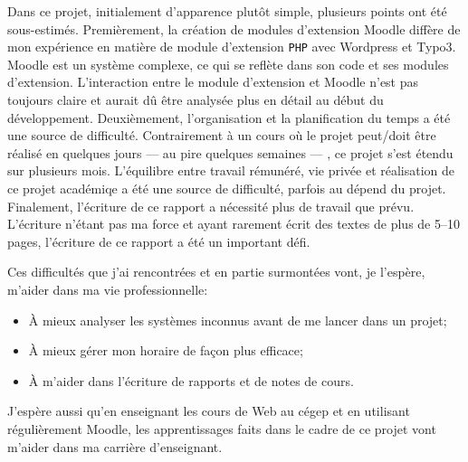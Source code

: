\begin{conclusion}
Dans ce projet, initialement d'apparence plut\^ot simple, plusieurs points ont \'et\'e sous-estim\'es.
Premi\`erement, la cr\'eation de modules d'extension Moodle diff\`ere de mon exp\'erience en mati\`ere de module d'extension \texttt{PHP} avec Wordpress et Typo3.
Moodle est un syst\`eme complexe, ce qui se refl\`ete dans son code et ses modules d'extension.
L'interaction entre le module d'extension et Moodle n'est pas toujours claire et aurait d\^u \^etre analys\'ee plus en d\'etail au d\'ebut du d\'eveloppement.
Deuxi\`emement, l'organisation et la planification du temps a \'et\'e une source de difficult\'e.
Contrairement \`a un cours o\`u le projet peut/doit \^etre r\'ealis\'e en quelques jours --- au pire quelques semaines --- , ce projet s'est \'etendu sur plusieurs mois.
L'\'equilibre entre travail r\'emun\'er\'e,  vie priv\'ee et r\'ealisation de ce projet acad\'emiqe a \'et\'e une source de difficult\'e, parfois au d\'epend du projet.
Finalement, l'\'ecriture de ce rapport a n\'ecessit\'e plus de travail que pr\'evu.
L'\'ecriture n'\'etant pas ma force et ayant rarement \'ecrit des textes de plus de 5--10 pages, l'\'ecriture de ce rapport a \'et\'e un important d\'efi.

Ces difficult\'es que j'ai rencontr\'ees et en partie surmont\'ees vont, je l'esp\`ere, m'aider dans ma vie professionnelle:
\begin{itemize}
  \item \`A mieux analyser les syst\`emes inconnus avant de me lancer dans un projet;
  \item \`A mieux g\'erer mon horaire de fa\c{c}on plus efficace;
  \item \`A m'aider dans l'\'ecriture de rapports et de notes de cours.
\end{itemize}
J'esp\`ere aussi qu'en enseignant les cours de Web au c\'egep et en utilisant r\'eguli\`erement Moodle, les apprentissages faits dans le cadre de ce projet vont m'aider dans ma carri\`ere d'enseignant.
\end{conclusion}
